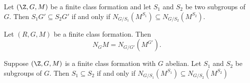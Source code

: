 \begin{corollary} \label{cor:norm submodule mono}
	Let $(\Z,G,M)$ be a finite class formation
	and let $S_1$ and $S_2$ be two subgroups of $G$.
	Then $S_1 G' \subseteq S_2 G'$ if and only if
	$N_{G/S_1}(M^{S_1}) \subseteq N_{G/S_2}(M^{S_2})$.
\end{corollary}

\begin{corollary}  \label{cor:norm limitiation}
	Let $(R,G,M)$ be a finite class formation. Then
	\[
		N_G M = N_{G/G'} (M^{G'}).
	\]
\end{corollary}

\begin{corollary} \label{cor:abelian norm submodule mono}
	Suppose $(\Z,G,M)$ is a finite class formation with $G$ abelian.
	Let $S_1$ and $S_2$ be subgroups of $G$.
	Then $S_1 \subseteq S_2$ if and only if $N_{G/S_1}(M^{S_1}) \subseteq N_{G/S_2}(M^{S_2})$
\end{corollary}

















